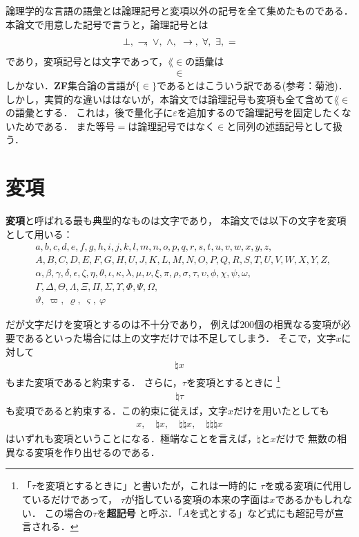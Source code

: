 	論理学的な言語の語彙とは論理記号と変項以外の記号を全て集めたものである．
	本論文で用意した記号で言うと，論理記号とは
	\begin{align}
		\bot,\ \negation,\ \vee,\ \wedge,\ \rarrow,\ \forall,\ \exists,\ =
	\end{align}
	であり，変項記号とは文字であって，$\lang{\in}$の語彙は
	\begin{align}
		\in
	\end{align}
	しかない．{\bf ZF}集合論の言語が$\{\in\}$であるとはこういう訳である(参考：菊池\cite{Kikuchi})．
	しかし，実質的な違いははないが，本論文では論理記号も変項も全て含めて$\lang{\in}$の語彙とする．
	これは，後で量化子に$\varepsilon$を追加するので論理記号を固定したくないためである．
	また等号$=$は論理記号ではなく$\in$と同列の述語記号として扱う．
	
\section{変項}
\label{sec:variables}
	{\bf 変項}と呼ばれる最も典型的なものは文字であり，
	本論文では以下の文字を変項として用いる：
	\begin{align}
		&a,b,c,d,e,f,g,h,i,j,k,l,m,n,o,p,q,r,s,t,u,v,w,x,y,z, \\
		&A,B,C,D,E,F,G,H,U,J,K,L,M,N,O,P,Q,R,S,T,U,V,W,X,Y,Z, \\
		&\alpha,\beta,\gamma,\delta,\epsilon,\zeta,\eta,\theta,\iota,
			\kappa,\lambda,\mu,\nu,\xi,\pi,\rho,\sigma,\tau,\upsilon,
			\phi,\chi,\psi,\omega, \\
		&\Gamma,\Delta,\Theta,\Lambda,\Xi,\Pi,\Sigma,\Upsilon,\Phi,\Psi,\Omega, \\
		&\vartheta,\ \varpi,\ \varrho,\ \varsigma,\ \varphi
	\end{align}
	
	だが文字だけを変項とするのは不十分であり，
	例えば$200$個の相異なる変項が必要であるといった場合には上の文字だけでは不足してしまう．
	そこで，文字$x$に対して
	\begin{align}
		\natural x
	\end{align}
	もまた変項であると約束する．
	さらに，$\tau$を変項とするときに
	\footnote{
		「$\tau$を変項とするときに」と書いたが，これは一時的に
		$\tau$を或る変項に代用しているだけであって，
		$\tau$が指している変項の本来の字面は$x$であるかもしれない．
		この場合の$\tau$を{\bf 超記号}
		と呼ぶ．「$A$を式とする」など式にも超記号が宣言される．
	}
	\begin{align}
		\natural \tau
	\end{align}
	も変項であると約束する．この約束に従えば，文字$x$だけを用いたとしても
	\begin{align}
		x,\quad \natural x, \quad \natural \natural x, \quad \natural \natural \natural x
	\end{align}
	はいずれも変項ということになる．極端なことを言えば，$\natural$と$x$だけで
	無数の相異なる変項を作り出せるのである．
	
